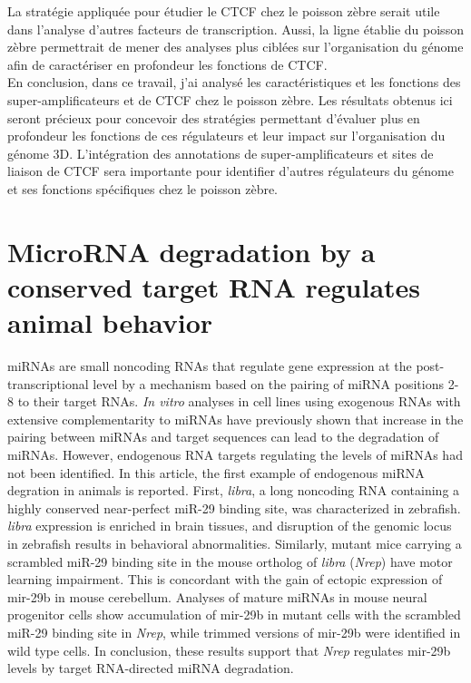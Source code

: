 		La strat\'egie appliqu\'ee pour \'etudier le CTCF chez le poisson z\`ebre serait utile dans l'analyse d'autres facteurs de transcription. Aussi, la ligne \'etablie du poisson z\`ebre permettrait de mener des analyses plus cibl\'ees sur l'organisation du g\'enome afin de caract\'eriser en profondeur les fonctions de CTCF.\\

		En conclusion, dans ce travail, j'ai analys\'e les caract\'eristiques et les fonctions des super-amplificateurs et de CTCF chez le poisson z\`ebre. Les r\'esultats obtenus ici seront pr\'ecieux pour concevoir des strat\'egies permettant d'\'evaluer plus en profondeur les fonctions de ces r\'egulateurs et leur impact sur l'organisation du g\'enome 3D. L'int\'egration des annotations de super-amplificateurs et sites de liaison de CTCF sera importante pour identifier d'autres r\'egulateurs du g\'enome et ses fonctions sp\'ecifiques chez le poisson z\`ebre.\\

	\newpage

	\section{MicroRNA degradation by a conserved target RNA regulates animal behavior}

		miRNAs are small noncoding RNAs that regulate gene expression at the post-transcriptional level by a mechanism based on the pairing of miRNA positions 2-8 to their target RNAs. \textit{In vitro} analyses in cell lines using exogenous RNAs with extensive complementarity to miRNAs have previously shown that increase in the pairing between miRNAs and target sequences can lead to the degradation of miRNAs. However, endogenous RNA targets regulating the levels of miRNAs had not been identified. In this article, the first example of endogenous miRNA degration in animals is reported. First, \textit{libra}, a long noncoding RNA containing a highly conserved near-perfect miR-29 binding site, was characterized in zebrafish. \textit{libra} expression is enriched in brain tissues, and disruption of the genomic locus in zebrafish results in behavioral abnormalities. Similarly, mutant mice carrying a scrambled miR-29 binding site in the mouse ortholog of \textit{libra} (\textit{Nrep}) have motor learning impairment. This is concordant with the gain of ectopic expression of mir-29b in mouse cerebellum. Analyses of mature miRNAs in mouse neural progenitor cells show accumulation of mir-29b in mutant cells with the scrambled miR-29 binding site in \textit{Nrep}, while trimmed versions of mir-29b were identified in wild type cells. In conclusion, these results support that \textit{Nrep} regulates mir-29b levels by target RNA-directed miRNA degradation.\\

